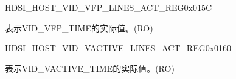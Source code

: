     
    \begin{register}{H}{DSI\_HOST\_VID\_VFP\_LINES\_ACT\_REG}{0x015C}\label{regdesc:DSIHOSTVIDVFPLINESACTREG}
    \regnewline%
    \begin{regdesc}\begin{reglist}
    \label{fielddesc:DSIHOSTVFPLINESACT}\item [DSI\_HOST\_VFP\_LINES\_ACT] 表示VID\_VFP\_TIME的实际值。(RO)
    \end{reglist}\end{regdesc}
    \end{register}
    
    
    \begin{register}{H}{DSI\_HOST\_VID\_VACTIVE\_LINES\_ACT\_REG}{0x0160}\label{regdesc:DSIHOSTVIDVACTIVELINESACTREG}
    \regnewline%
    \begin{regdesc}\begin{reglist}
    \label{fielddesc:DSIHOSTVACTIVELINESACT}\item [DSI\_HOST\_V\_ACTIVE\_LINES\_ACT] 表示VID\_VACTIVE\_TIME的实际值。(RO)
    \end{reglist}\end{regdesc}
    \end{register}
    
